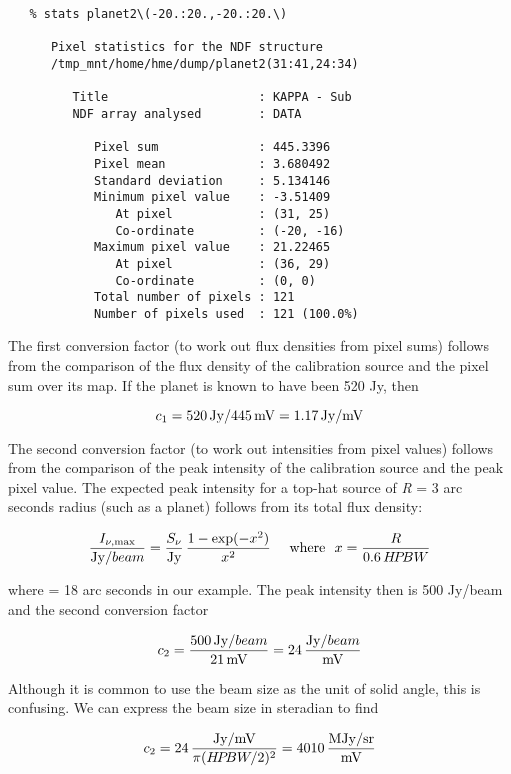 \begin{verbatim}
   % stats planet2\(-20.:20.,-20.:20.\)

      Pixel statistics for the NDF structure
      /tmp_mnt/home/hme/dump/planet2(31:41,24:34)

         Title                     : KAPPA - Sub
         NDF array analysed        : DATA

            Pixel sum              : 445.3396
            Pixel mean             : 3.680492
            Standard deviation     : 5.134146
            Minimum pixel value    : -3.51409
               At pixel            : (31, 25)
               Co-ordinate         : (-20, -16)
            Maximum pixel value    : 21.22465
               At pixel            : (36, 29)
               Co-ordinate         : (0, 0)
            Total number of pixels : 121
            Number of pixels used  : 121 (100.0%)
\end{verbatim}

   The first conversion factor (to work out flux densities from pixel
   sums) follows from the comparison of the flux density of the
   calibration source and the pixel sum over its map. If the planet is
   known to have been 520 Jy, then

\[c_1 = 520\,{\rm Jy} / 445\,{\rm mV} = 1.17\,{\rm Jy/mV}\]

   The second conversion factor (to work out intensities from pixel
   values) follows from the comparison of the peak intensity of the
   calibration source and the peak pixel value. The expected peak
   intensity for a top-hat source of {\it R\/} = 3 arc seconds radius
   (such as a planet) follows from its total flux density:

\[{I_{\nu,\rm max} \over {\rm Jy}/beam}
    = {S_{\nu} \over {\rm Jy}}
    \, {1 - \exp(-x^2) \over x^2}
\mbox{\ \ \ \ where\ \ }
  x = {R \over 0.6\,H\!P\!BW}\]

   where
   = 18 arc seconds in our example. The peak intensity then is 500
   Jy/beam and the second conversion factor

\[c_2 = {500\,{\rm Jy}/beam \over 21\,{\rm mV}}
      =  24\,{{\rm Jy}/beam \over     {\rm mV}}\]

   Although it is common to use the beam size as the unit of solid
   angle, this is confusing. We can express the beam size in steradian
   to find

\[c_2 =  24\,{{\rm Jy/mV} \over \pi (H\!P\!BW/2)^2}
      = 4010\,{\rm MJy/sr \over mV}\]

